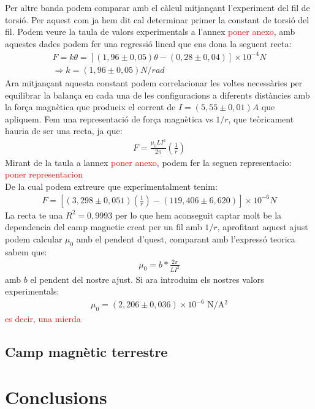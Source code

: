 \documentclass[a4paper,10.5pt]{report}
\begin{document}
Per altre banda podem comparar amb el càlcul mitjançant l'experiment del fil de torsió. Per aquest com ja hem dit cal determinar primer la constant de torsió del fil. Podem veure la taula de valors experimentals a l'annex \textcolor{red}{poner anexo}, amb aquestes dades podem fer una regressió lineal que ens dona la seguent recta:
\begin{eqnarray}
	F = k\theta = \left[(1,96 \pm 0,05)\theta - (0,28 \pm 0,04)\right]\times 10^{-4} N\\
	\Rightarrow k = (1,96 \pm 0,05)N/rad
\end{eqnarray}
Ara mitjançant aquesta constant podem correlacionar les voltes necessàries per equilibrar la balança en cada una de les configuracions a diferents distàncies amb la força magnètica que produeix el corrent de $I = (5,55 \pm 0,01)A$ que apliquem. Fem una representació de força magnètica vs $1/r$, que teòricament hauria de ser una recta, ja que:
\begin{eqnarray}
	F = \frac{\mu_0LI^2}{2\pi}\left(\frac{1}{r}\right)
\end{eqnarray}
Mirant de la taula a lannex \textcolor{red}{poner anexo}, podem fer la seguen representacio:\\
\textcolor{red}{poner representacion}\\
De la cual podem extreure que experimentalment tenim:
\begin{eqnarray}
	F  = \left[(3,298 \pm 0,051)\left(\frac{1}{r}\right) - (119,406 \pm 6,620)\right]\times 10^{-6}N
\end{eqnarray}
La recta te una $R^2 = 0,9993$ per lo que hem aconseguit captar molt be la dependencia del camp magnetic creat per un fil amb $1/r$, aprofitant aquest ajust podem calcular $\mu_0$ amb el pendent d'quest, comparant amb l'expressó teorica sabem que:
\begin{eqnarray}
	\mu_0 = b*\frac{2\pi}{LI^2}
\end{eqnarray}
amb $b$ el pendent del nostre ajust. Si ara introduim els nostres valors experimentals:
\begin{eqnarray}
	\mu_0 = (2,206 \pm 0,036)\times10^{-6}\text{ N$/$A$^2$}
\end{eqnarray}
\textcolor{red}{es decir, una mierda}
\subsection{Camp magnètic terrestre}

\section{Conclusions}
\end{document}
